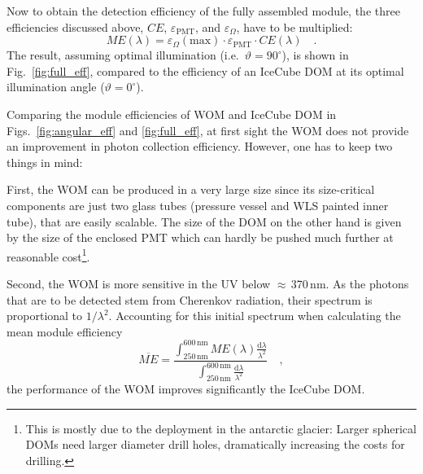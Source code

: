 
Now to obtain the detection efficiency of the fully assembled module, the three 
efficiencies discussed above, $CE$, $\varepsilon_\mathrm{PMT}$, and 
$\varepsilon_\Omega$, have to be multiplied:
\begin{equation}
 ME(\lambda) = \varepsilon_\Omega(\mathrm{max}) \cdot \varepsilon_\mathrm{PMT} 
\cdot CE(\lambda)\quad.
\end{equation}
The result, assuming optimal illumination (i.e.\ $\vartheta=90^\circ$), is
shown in Fig.~\ref{fig:full_eff}, compared to the efficiency of an IceCube DOM
at its optimal illumination angle ($\vartheta=0^\circ$).

Comparing the module efficiencies of WOM and IceCube DOM in 
Figs.~\ref{fig:angular_eff} and \ref{fig:full_eff}, at first sight the WOM does
not provide an improvement in photon collection efficiency. However, one has to
keep two things in mind:

First, the WOM can be produced in a very large size since its size-critical 
components are just two glass tubes (pressure vessel and WLS painted inner 
tube), that are easily scalable. The size of the DOM on the other hand is given 
by the size of the enclosed PMT which can hardly be pushed much further at 
reasonable cost\footnote{This is mostly due to the deployment in the antarctic 
glacier: Larger spherical DOMs need larger diameter drill holes, dramatically 
increasing the costs for drilling.}.

Second, the WOM is more sensitive in the UV below $\approx$\,370\,nm. As the 
photons that are to be detected stem from Cherenkov radiation, their spectrum is 
proportional to $1/\lambda^2$. Accounting for this initial spectrum when
calculating the mean module efficiency
\begin{equation}
 \overline{ME} = %
\frac{ \int_{250\,\mathrm{nm}}^{600\,\mathrm{nm}} ME(\lambda) 
\frac{\mathrm{d}\lambda}{\lambda^2}}
{\int_{250\,\mathrm{nm}}^{600\,\mathrm{nm}} \frac{\mathrm{d}\lambda}{\lambda^2} 
}\quad,
\end{equation}
the performance of the WOM improves significantly \wrt the IceCube DOM.

